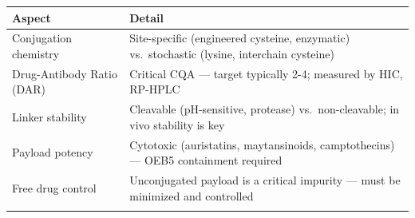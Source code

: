 \documentclass[
  11pt,
  a4paper,
]{report}
\begin{document}
\begin{longtable}[]{@{}ll@{}}
\toprule
\begin{minipage}[b]{0.47\columnwidth}\raggedright
Aspect\strut
\end{minipage} & \begin{minipage}[b]{0.47\columnwidth}\raggedright
Detail\strut
\end{minipage}\tabularnewline
\midrule
\endhead
\begin{minipage}[t]{0.47\columnwidth}\raggedright
Conjugation chemistry\strut
\end{minipage} & \begin{minipage}[t]{0.47\columnwidth}\raggedright
Site-specific (engineered cysteine, enzymatic) vs.~stochastic (lysine,
interchain cysteine)\strut
\end{minipage}\tabularnewline
\begin{minipage}[t]{0.47\columnwidth}\raggedright
Drug-Antibody Ratio (DAR)\strut
\end{minipage} & \begin{minipage}[t]{0.47\columnwidth}\raggedright
Critical CQA --- target typically 2-4; measured by HIC, RP-HPLC\strut
\end{minipage}\tabularnewline
\begin{minipage}[t]{0.47\columnwidth}\raggedright
Linker stability\strut
\end{minipage} & \begin{minipage}[t]{0.47\columnwidth}\raggedright
Cleavable (pH-sensitive, protease) vs.~non-cleavable; in vivo stability
is key\strut
\end{minipage}\tabularnewline
\begin{minipage}[t]{0.47\columnwidth}\raggedright
Payload potency\strut
\end{minipage} & \begin{minipage}[t]{0.47\columnwidth}\raggedright
Cytotoxic (auristatins, maytansinoids, camptothecins) --- OEB5
containment required\strut
\end{minipage}\tabularnewline
\begin{minipage}[t]{0.47\columnwidth}\raggedright
Free drug control\strut
\end{minipage} & \begin{minipage}[t]{0.47\columnwidth}\raggedright
Unconjugated payload is a critical impurity --- must be minimized and
controlled\strut
\end{minipage}\tabularnewline
\begin{minipage}[t]{0.47\columnwidth}\raggedright

\end{minipage}
\end{longtable}
\end{document}
